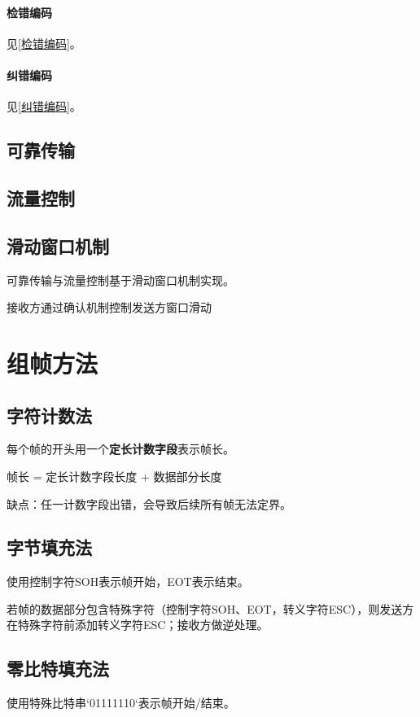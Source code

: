 \paragraph{检错编码}
见\ref{检错编码}。


\paragraph{纠错编码}
见\ref{纠错编码}。


\subsection{可靠传输}


\subsection{流量控制}


\subsection{滑动窗口机制}
可靠传输与流量控制基于滑动窗口机制实现。

接收方通过确认机制控制发送方窗口滑动


\section{组帧方法}\label{组帧方法}

\subsection{字符计数法}
每个帧的开头用一个\textbf{定长计数字段}表示帧长。

帧长 = 定长计数字段长度 + 数据部分长度

缺点：任一计数字段出错，会导致后续所有帧无法定界。


\subsection{字节填充法}
使用控制字符SOH表示帧开始，EOT表示结束。

若帧的数据部分包含特殊字符（控制字符SOH、EOT，转义字符ESC），则发送方在特殊字符前添加转义字符ESC；接收方做逆处理。


\subsection{零比特填充法}
使用特殊比特串`01111110`表示帧开始/结束。

